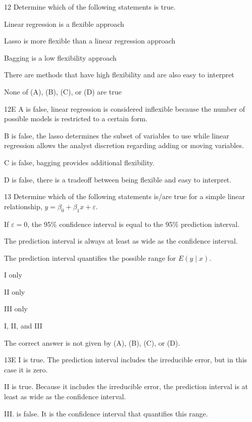 \begin{question}{12}
Determine which of the following statements is true.

\begin{choices}
\item Linear regression is a flexible approach
\item Lasso is more flexible than a linear regression approach
\item Bagging is a low flexibility approach
\item There are methods that have high flexibility and are also easy to interpret
\item None of (A), (B), (C), or (D) are true
\end{choices}
\end{question}
\begin{solution}{12}{E}
A is false, linear regression is considered inflexible because the number of possible models is restricted to a certain form.

B is false, the lasso determines the subset of variables to use while linear regression allows the analyst discretion regarding adding or moving variables.

C is false, bagging provides additional flexibility.

D is false, there is a tradeoff between being flexible and easy to interpret.
\end{solution}

\begin{question}{13}
Determine which of the following statements is/are true for a simple linear relationship, $y = \beta_0 + \beta_1 x + \varepsilon$.
\begin{statements}
\item If $\varepsilon = 0$, the 95\% confidence interval is equal to the 95\% prediction interval.
\item The prediction interval is always at least as wide as the confidence interval.
\item The prediction interval quantifies the possible range for $E(y \mid x)$.
\end{statements}

\begin{choices}
\item I only
\item II only
\item III only
\item I, II, and III
\item The correct answer is not given by (A), (B), (C), or (D).
\end{choices}
\end{question}
\begin{solution}{13}{E}
I is true. The prediction interval includes the irreducible error, but in this case it is zero.

II is true. Because it includes the irreducible error, the prediction interval is at least as wide as the confidence interval.

III. is false. It is the confidence interval that quantifies this range.
\end{solution}

